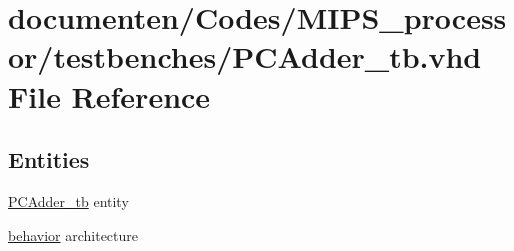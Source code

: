 \hypertarget{_p_c_adder__tb_8vhd}{\section{documenten/\-Codes/\-M\-I\-P\-S\-\_\-processor/testbenches/\-P\-C\-Adder\-\_\-tb.vhd File Reference}
\label{_p_c_adder__tb_8vhd}
}
\subsection*{Entities}
\begin{DoxyCompactItemize}
\item 
\hyperlink{class_p_c_adder__tb}{P\-C\-Adder\-\_\-tb} entity
\item 
\hyperlink{class_p_c_adder__tb_1_1behavior}{behavior} architecture
\end{DoxyCompactItemize}
